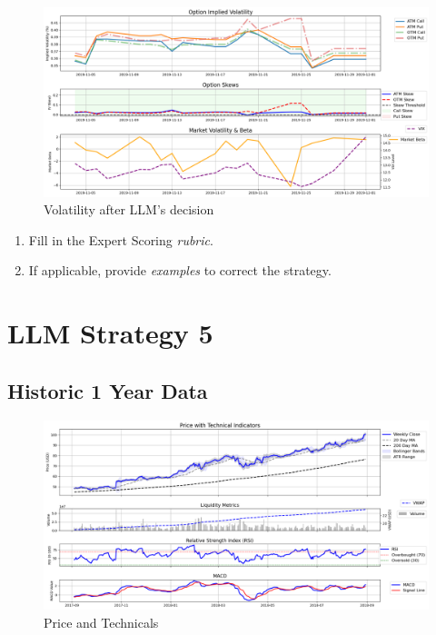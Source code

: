 \documentclass[8pt]{scrartcl}
\begin{document}
\begin{figure}[H]
    \centering
    \includegraphics[width=1\linewidth]{judge_reviews/TSLA_M_gpt-4o-mini/2019-11-01/llm_Market_Volatility_&_Beta.png}
    \caption{Volatility after LLM's decision}
\end{figure}

\begin{tcolorbox}[colback=blue!10, colframe=blue!60, title=\textbf{TASKS}, sharp corners=southwest]
\begin{enumerate}
    \item Fill in the Expert Scoring \textit{rubric}.
    \item If applicable, provide \textit{examples} to correct the strategy.
\end{enumerate}
\end{tcolorbox}
\newpage


\section*{LLM Strategy 5}
\label{app:s5}

\subsection*{Historic 1 Year Data}

\begin{figure}[H]
    \centering
    \includegraphics[width=1\linewidth]{judge_reviews//AMZN_M_gpt-4o-mini//2018-09-01/judge_Price_with_Technical_Indicators.png}
    \caption{Price and Technicals}
\end{figure}
\end{document}
